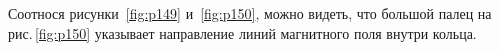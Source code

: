 \documentclass[main.tex]{subfiles}
\begin{document}
\begin{NoHyper}
Соотнося рисунки~\ref{fig:p149} и~\ref{fig:p150}, можно видеть, что большой палец на рис.\,\ref{fig:p150} указывает направление линий магнитного поля внутри кольца.


















\end{NoHyper}
\end{document}
